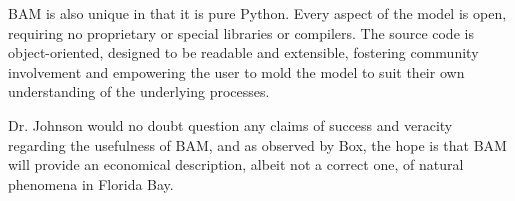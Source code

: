 BAM is also unique in that it is pure Python.  Every aspect of the model is open, requiring no proprietary or special libraries or compilers.  The source code is object-oriented, designed to be readable and extensible, fostering community involvement and empowering the user to mold the model to suit their own understanding of the underlying processes. 

Dr. Johnson would no doubt question any claims of success and veracity regarding the usefulness of BAM, and as observed by Box, the hope is that BAM will provide an economical description, albeit not a correct one, of natural phenomena in Florida Bay.

\cleardoublepage

